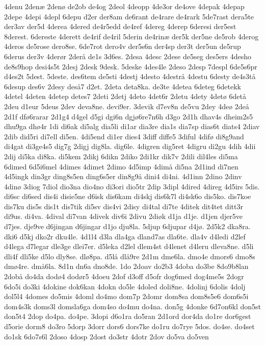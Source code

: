 {4denu
2denæ
2denø
de2ob
de4og
2deol
4deopp
4de3or
de4ove
4depak
4depap
2depe
4depi
4depl
6depu
d2er
der8am
de6rant
de4rare
de4rark
5de7rast
dera5te
der3av
der5d
4derea
4dered
de4r5edd
de4ref
4dereg
4derep
6deresi
der5est
8derest.
6dereste
4derett
de4rif
de4ril
5derin
de4rinæ
der5k
der5ne
de5rob
4derog
4deros
de5rose
dero8se.
6de7rot
dero4v
der5s6n
der4sp
der3t
der5un
de5rup
6derus
der3v
4derør
2derå
de1s
3d6es.
2desa
4desc
2dese
de5seg
des5ers
4desho
de8s9hop
desi4s5t
2desj
2desk
9desk.
5deske
4des4le
2deso
2desp
7despl
6de5s6pr
d4es2t
5dest.
5deste.
des6tem
de5sti
4destj
4desto
4destrå
4destu
6desty
de4s3tå
6desup
des6v
2desy
deså7
d2et.
2deta
deta8ka.
de3te
4detea
6deteg
6detekk
4detel
4deten
4detep
detes7
2deti
2detj
4deto
4det6r
2detu
4dety
4detø
6detå
2deu
d1eur
5deus
2dev
deva8ne.
devi9er.
3devik
d7ev8n
de5vu
2dey
4deø
2deå
2d1f
dfø6rarar
2d1g4
d4gel
d5gi
dgi6n
dgjø6re7n6h
d3go
2d1h
dhav4s
dheim2s5
dhu9ga
dhø4r
1di
di6ak
di5alg
dia5li
di1ar
dia3re
dia1s
dia7sp
dias6t
diats4
2diav
2dib
did5ri
di7ell
di5en.
4di5end
di1er
dies4
3diff
diffe5
3diful
4difø
di8g9and
di4gat
di3ge4s5
dig7g
2digj
dig8la.
dig6le.
4digren
dig5ret
4digru
di2gu
4dih
4dii
2dij
di5ka
di8ka.
di5kem
2dikj
6dikn
2diko
2di1kr
dik7v
2dili
dil4les
di5ma
6dimed
6d5i6mel
4dimes
4dimet
2dimo
4d5imp
4dimå
di5na
2d1ind
di7nen
4d5ingk
din3gr
ding8s5en
ding6s5er
din8g9å
dini4
di4ni.
4d1inn
2dino
2dinv
4dinø
3diog
7diol
dio3na
dio4no
di3ori
dio5tr
2dip
3dipl
4dired
4direg
4d5irs
5dis.
di6sc
di6sed
dis4i
disie5ne
d6isk
dis6kam
di4skj
dis6k7l
di4sk6o
dis5ko.
dis7koe
dis7ku
dis5s
dis1t
dis7tik
di5sv
dis4vi
2disy
di4tal
di7te
4ditek
dit4tet
ditt3r
di9us.
di4va.
4dival
di7van
4divek
div6i
2divu
2diøk
d1ja
d1je.
d1jen
djer5ve
d7jes.
dje9ve
d6jingan
d6jingar
d1jo
dju8la.
5djup
6djupar
d4jø.
2d5k2
dka8ra.
dki6
d5kj
dko2r
dku4le.
4d1l4
d3la
dla4ga
dland7as
dla6te.
dla4v
d4ledi
d2lef
d4lega
d7legar
dle3ge
dlei7er.
d5leka
d2lel
dlem4st
d4lenet
d4leru
dleva8ne.
d5li
dli4f
dli5ke
d5lo
dly8se.
dlø8pa.
d5lå
dlå9re
2d1m
dme6la.
dmo4e
dmors6
dmo8s
dmø4re.
dmå6la.
8d1n
dn6a
dno8de.
1do
2doav
do2b3
4doba
do3be
8do9b8lan
2dobå
do4da
dodø4
dodør5
4doeu
2dof
d3off
d5ofr
dog6med
dog4me5s
2dogr
6do5i
do3ki
4dokine
dok6kan
4dokn
do5le
4doled
doli8ne.
4dolinj
6dolis
4dolj
dol5l4
4domes
do5mis
4doml
do4mo
dom7p
2domr
dom8sa
dom8s5e6
dom6s5i
dom4s3k
doms3l
domsla6ga
dom4so
do4mu
do4na.
don5g
4donke
6d7on6kl
don5st
don5t4
2dop
do4pa.
do4pe.
3dopi
d6o1ra
do5ran
2d1ord
dor4da
do1re
dor6gest
d5orie
dorm8
do3ro
5dorp
3dorr
dors6
dors7ke
do1ru
do7rye
5dos.
do4se.
do4set
do1sk
6do7s6l
2doso
4dosp
2dost
do3str
4dotr
2dov
do5va
do5ven
}

